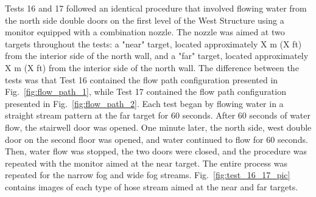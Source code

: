 \documentclass[12pt,oneside]{book}
\begin{document}
Tests 16 and 17 followed an identical procedure that involved flowing water from the north side double doors on the first level of the West Structure using a monitor equipped with a combination nozzle. The nozzle was aimed at two targets throughout the tests: a "near" target, located approximately X m (X ft) from the interior side of the north wall, and a "far" target, located approximately X m (X ft) from the interior side of the north wall. The difference between the tests was that Test 16 contained the flow path configuration presented in Fig.~\ref{fig:flow_path_1}, while Test 17 contained the flow path configuration presented in Fig.~\ref{fig:flow_path_2}. Each test began by flowing water in a straight stream pattern at the far target for 60 seconds. After 60 seconds of water flow, the stairwell door was opened. One minute later, the north side, west double door on the second floor was opened, and water continued to flow for 60 seconds. Then, water flow was stopped, the two doors were closed, and the procedure was repeated with the monitor aimed at the near target. The entire process was repeated for the narrow fog and wide fog streams. Fig.~\ref{fig:test_16_17_pic} contains images of each type of hose stream aimed at the near and far targets.
\end{document}
